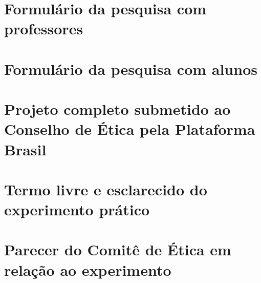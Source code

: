 \documentclass[
	12pt,				%
	oneside,			%
	a4paper,			%
	english,			%
	brazil				%
	]{abntex2ppgsi}
\begin{document}
\begin{apendicesenv}


%
%
%

\chapter{Formulário da pesquisa com professores}
\label{cap:formulario_pesquisa_professores}


\chapter{Formulário da pesquisa com alunos}
\label{cap:formulario_pesquisa_alunos}


\chapter{Projeto completo submetido ao Conselho de Ética pela Plataforma Brasil}
\label{cap:projeto_informacoes}


\chapter{Termo livre e esclarecido do experimento prático}
\label{cap:termo_livre_esclarecido}


\chapter{Parecer do Comitê de Ética em relação ao experimento}
\label{cap:parecer}



\end{apendicesenv}
\end{document}
